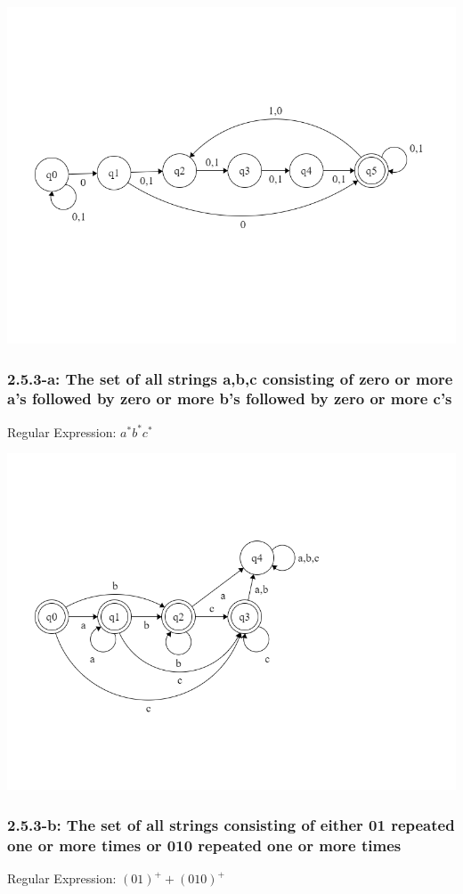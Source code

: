 \documentclass{article}
\theoremstyle{theorem}
\theoremstyle{definition}
\theoremstyle{remark}
\begin{document}
\includegraphics[scale=0.4]{Images/2.3.4c.png}

\subsubsection{2.5.3-a: The set of all strings {a,b,c} consisting of zero or more a's followed by zero or more b's followed by zero or more c's}
Regular Expression: $a^*b^*c^*$

\includegraphics[scale=0.4]{Images/2.5.3a.png}

\subsubsection{2.5.3-b: The set of all strings consisting of either 01 repeated one or more times or 010 repeated one or more times}
Regular Expression: $(01)^++(010)^+$
\end{document}
